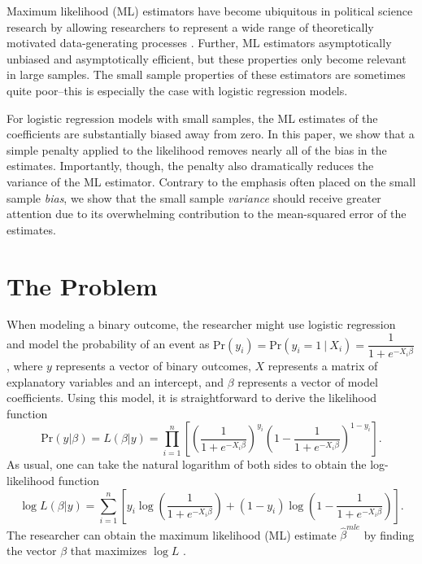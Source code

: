 \documentclass[12pt]{article}
\begin{document}
\thispagestyle{empty}

\newpage
\doublespace

Maximum likelihood (ML) estimators have become ubiquitous in political science research by allowing researchers to represent a wide range of theoretically motivated data-generating processes \citep{King1989}. 
Further, ML estimators asymptotically unbiased and asymptotically efficient, but these properties only become relevant in large samples. 
The small sample properties of these estimators are sometimes quite poor--this is especially the case with logistic regression models. 

For logistic regression models with small samples, the ML estimates of the coefficients are substantially biased away from zero. 
In this paper, we show that a simple penalty applied to the likelihood removes nearly all of the bias in the estimates. 
Importantly, though, the penalty also dramatically reduces the variance of the ML estimator.
Contrary to the emphasis often placed on the small sample \textit{bias}, we show that the small sample \textit{variance} should receive greater attention due to its overwhelming contribution to the mean-squared error of the estimates.

\section*{The Problem}

When modeling a binary outcome, the researcher might use logistic regression and model the probability of an event as $\text{Pr}(y_i) = \text{Pr}(y_i = 1~|~ X_i) = \dfrac{1}{1 + e^{-X_i\beta}}$, where $y$ represents a vector of binary outcomes, $X$ represents a matrix of explanatory variables and an intercept, and $\beta$ represents a vector of model coefficients. 
Using this model, it is straightforward to derive the likelihood function 
\begin{equation}\nonumber
\text{Pr}(y | \beta) = L(\beta | y) = \displaystyle \prod_{i = 1}^n \left[\left( \dfrac{1}{1 + e^{-X_i\beta}}\right)^{y_i}\left(1- \dfrac{1}{1 + e^{-X_i\beta}}\right)^{1 - y_i}\right]\text{.}
\end{equation}
\noindent As usual, one can take the natural logarithm of both sides to obtain the log-likelihood function 
\begin{equation}\nonumber
\log L(\beta | y) = \displaystyle \sum_{i = 1}^n \left[y_i \log \left( \dfrac{1}{1 + e^{-X_i\beta}}\right) + (1 - y_i) \log \left(1- \dfrac{1}{1 + e^{-X_i\beta}}\right)\right].
\end{equation}
\noindent The researcher can obtain the maximum likelihood (ML) estimate $\hat{\beta}^{mle}$ by finding the vector $\beta$ that maximizes $\log L$ \citep{King1989}. 
\end{document}
